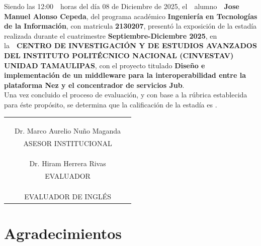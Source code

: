 \documentclass[12pt]{article}
\newcommand{\ncarrera}            {Ingeniería en Tecnologías de la Información}
\newcommand{\nasesorinstitucional}{Dr. Marco Aurelio Nuño Maganda}
\newcommand{\NombreAlumno}{Jose Manuel Alonso Cepeda}
\newcommand{\elolaNombreAlumno}{el}
\newcommand{\OA}           {o}  %
\newcommand{\Matricula}           {2130207}  %
\newcommand{\NombreProyecto}{Diseño e implementación de un middleware para la interoperabilidad entre la plataforma Nez y el concentrador de servicios Jub}
\newcommand{\ncuatrimestre}{Septiembre-Diciembre 2025}
\newcommand{\nevalador}{Dr. Hiram Herrera Rivas}
\newcommand{\FechaExposicion}{08 de Diciembre de 2025}
\newcommand{\HoraExposionFormatoVenticuatroHoras}{12:00}
\newcommand{\elolaNombreEmpresa}{la}  %
\newcommand{\organismoreceptor}   {CENTRO DE INVESTIGACIÓN Y DE ESTUDIOS
 AVANZADOS DEL INSTITUTO POLITÉCNICO NACIONAL (CINVESTAV) UNIDAD TAMAULIPAS}
\begin{document}
Siendo las \HoraExposionFormatoVenticuatroHoras \ \ horas del día \FechaExposicion, \elolaNombreAlumno\ \ alumn\OA\ \ \textbf{\NombreAlumno}, del programa académico \textbf{\ncarrera}, con matricula \textbf{\Matricula}, presentó la exposición de la estadía realizada durante el cuatrimestre \textbf{\ncuatrimestre}, en \elolaNombreEmpresa\ \ \textbf{\organismoreceptor}, con el proyecto titulado \textbf{\NombreProyecto}.\\

Una vez concluido el proceso de evaluación, y con base a la rúbrica establecida para éste propósito, se determina que la calificación de la estadía es \underline{\hspace{2cm}}. %

\begin{center}
\begin{tabular}{ccc}
& & \\
& & \\
& & \\
\hline 
& \nasesorinstitucional & \\
& ASESOR INSTITUCIONAL & \\
& & \\
& & \\
& & \\
\hline 
& \nevalador & \\
& EVALUADOR & \\
& & \\
& & \\
\hline 
& & \\
& EVALUADOR DE INGLÉS & \\
\end{tabular}
\end{center}

\normalsize

\clearpage
\ClearWallPaper
\pagestyle{fancy}
\section*{\centering Agradecimientos}
%
\end{document}
